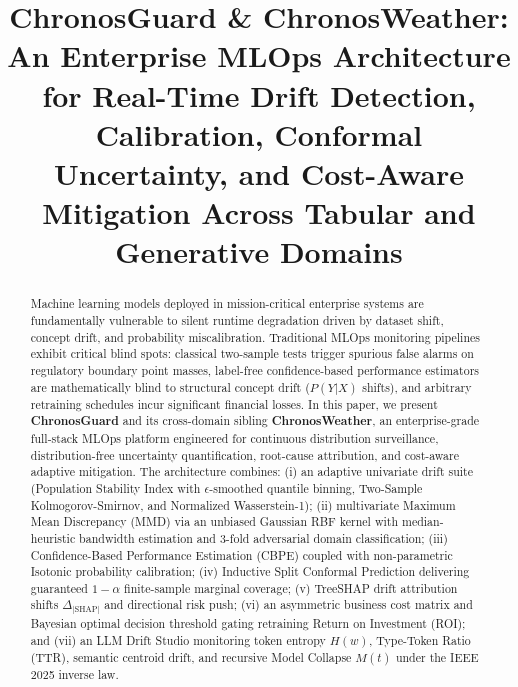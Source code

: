 \documentclass[conference]{IEEEtran}
\begin{document}
\title{ChronosGuard \& ChronosWeather: An Enterprise MLOps Architecture for Real-Time Drift Detection, Calibration, Conformal Uncertainty, and Cost-Aware Mitigation Across Tabular and Generative Domains}

\author{
}

\maketitle

\begin{abstract}
Machine learning models deployed in mission-critical enterprise systems are fundamentally vulnerable to silent runtime degradation driven by dataset shift, concept drift, and probability miscalibration. Traditional MLOps monitoring pipelines exhibit critical blind spots: classical two-sample tests trigger spurious false alarms on regulatory boundary point masses, label-free confidence-based performance estimators are mathematically blind to structural concept drift ($P(Y|X)$ shifts), and arbitrary retraining schedules incur significant financial losses. In this paper, we present \textbf{ChronosGuard} and its cross-domain sibling \textbf{ChronosWeather}, an enterprise-grade full-stack MLOps platform engineered for continuous distribution surveillance, distribution-free uncertainty quantification, root-cause attribution, and cost-aware adaptive mitigation. The architecture combines: (i) an adaptive univariate drift suite (Population Stability Index with $\epsilon$-smoothed quantile binning, Two-Sample Kolmogorov-Smirnov, and Normalized Wasserstein-1); (ii) multivariate Maximum Mean Discrepancy (MMD) via an unbiased Gaussian RBF kernel with median-heuristic bandwidth estimation and 3-fold adversarial domain classification; (iii) Confidence-Based Performance Estimation (CBPE) coupled with non-parametric Isotonic probability calibration; (iv) Inductive Split Conformal Prediction delivering guaranteed $1-\alpha$ finite-sample marginal coverage; (v) TreeSHAP drift attribution shifts $\Delta_{|\text{SHAP}|}$ and directional risk push; (vi) an asymmetric business cost matrix and Bayesian optimal decision threshold gating retraining Return on Investment (ROI); and (vii) an LLM Drift Studio monitoring token entropy $H(w)$, Type-Token Ratio (TTR), semantic centroid drift, and recursive Model Collapse $M(t)$ under the IEEE 2025 inverse law. 

\end{abstract}
\end{document}
